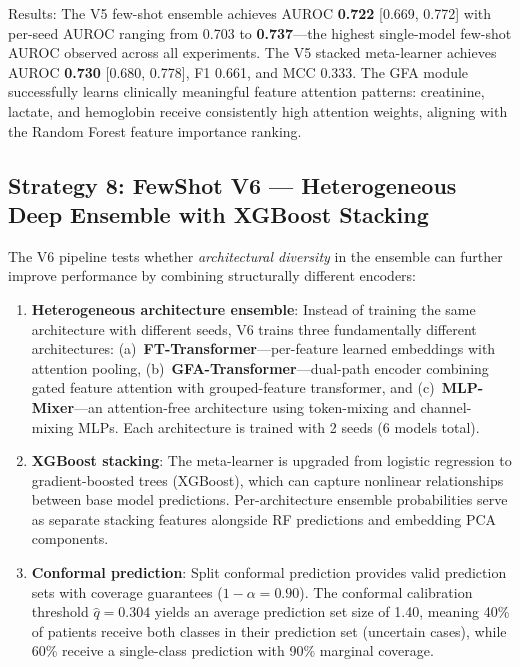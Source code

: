 Results: The V5 few-shot ensemble achieves AUROC \textbf{0.722} [0.669, 0.772] with per-seed AUROC ranging from 0.703 to \textbf{0.737}---the highest single-model few-shot AUROC observed across all experiments. The V5 stacked meta-learner achieves AUROC \textbf{0.730} [0.680, 0.778], F1 0.661, and MCC 0.333. The GFA module successfully learns clinically meaningful feature attention patterns: creatinine, lactate, and hemoglobin receive consistently high attention weights, aligning with the Random Forest feature importance ranking.

\subsection{Strategy 8: FewShot V6 --- Heterogeneous Deep Ensemble with XGBoost Stacking}
\label{sec:v6-strategy}

The V6 pipeline tests whether \emph{architectural diversity} in the ensemble can further improve performance by combining structurally different encoders:

\begin{enumerate}
\item \textbf{Heterogeneous architecture ensemble}: Instead of training the same architecture with different seeds, V6 trains three fundamentally different architectures: (a)~\textbf{FT-Transformer}---per-feature learned embeddings with attention pooling, (b)~\textbf{GFA-Transformer}---dual-path encoder combining gated feature attention with grouped-feature transformer, and (c)~\textbf{MLP-Mixer}---an attention-free architecture using token-mixing and channel-mixing MLPs. Each architecture is trained with 2 seeds (6 models total).

\item \textbf{XGBoost stacking}: The meta-learner is upgraded from logistic regression to gradient-boosted trees (XGBoost), which can capture nonlinear relationships between base model predictions. Per-architecture ensemble probabilities serve as separate stacking features alongside RF predictions and embedding PCA components.

\item \textbf{Conformal prediction}: Split conformal prediction provides valid prediction sets with coverage guarantees ($1 - \alpha = 0.90$). The conformal calibration threshold $\hat{q} = 0.304$ yields an average prediction set size of 1.40, meaning 40\% of patients receive both classes in their prediction set (uncertain cases), while 60\% receive a single-class prediction with 90\% marginal coverage.
\end{enumerate}

